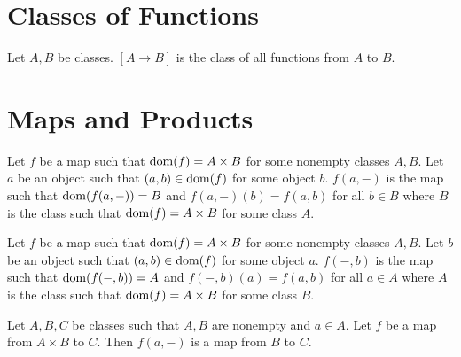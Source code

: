 \documentclass[10pt]{article}
\begin{document}
  \section{Classes of Functions}

  \begin{forthel}
    \begin{definition}
      Let $A, B$ be classes.
      $[A \to B]$ is the class of all functions from $A$ to $B$.
    \end{definition}
  \end{forthel}


  \section{Maps and Products}

  \begin{forthel}
    \begin{definition}
      Let $f$ be a map such that $\operatorname{dom}(f) = A \times B$ for some nonempty
      classes $A, B$.
      Let $a$ be an object such that $(a,b) \in \operatorname{dom}(f)$ for some object $b$.
      $f(a,-)$ is the map such that $\operatorname{dom}(f(a,-)) = B$ and $f(a,-)(b) = f(a,b)$
      for all $b \in B$ where $B$ is the class such that $\operatorname{dom}(f) = A \times B$
      for some class $A$.
    \end{definition}
  \end{forthel}

  \begin{forthel}
    \begin{definition}
      Let $f$ be a map such that $\operatorname{dom}(f) = A \times B$ for some nonempty
      classes $A, B$.
      Let $b$ be an object such that $(a,b) \in \operatorname{dom}(f)$ for some object $a$.
      $f(-,b)$ is the map such that $\operatorname{dom}(f(-,b)) = A$ and $f(-,b)(a) = f(a,b)$
      for all $a \in A$ where $A$ is the class such that $\operatorname{dom}(f) = A \times B$
      for some class $B$.
    \end{definition}
  \end{forthel}

  \begin{forthel}
    \begin{proposition}
      Let $A, B, C$ be classes such that $A, B$ are nonempty and $a \in A$.
      Let $f$ be a map from $A \times B$ to $C$.
      Then $f(a,-)$ is a map from $B$ to $C$.
    \end{proposition}
  \end{forthel}
\end{document}

